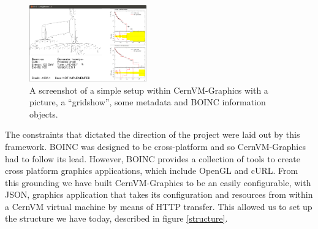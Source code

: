 \documentclass[twocolumn,aps]{revtex4}
\newcommand{\cernvm}{CernVM}
\newcommand{\cernvmgraphics}{\cernvm{}-Graphics}
\newcommand{\boinc}{BOINC}
\newcommand{\opengl}{OpenGL}
\newcommand{\curl}{cURL}
\newcommand{\json}{JSON}
\begin{document}
    \begin{figure}[hbt]
      \label{screenshot}
      \centering
        \includegraphics[width=0.45\textwidth]{graphics/screenshot.png}
      \caption
      {
        A screenshot of a simple setup within \cernvmgraphics{} with a
        picture, a ``gridshow'', some metadata and \boinc{} information 
        objects.
      }
    \end{figure}


    The constraints that dictated the direction of the project were laid out
    by this framework.  \boinc{} was designed to be cross-platform and so 
    \cernvmgraphics{} had to follow its lead. However, \boinc{} provides a 
    collection of tools to create cross platform graphics applications,
    which include \opengl{} and \curl{}. From this grounding we have built
    \cernvmgraphics{} to be an easily configurable, with \json{}, graphics 
    application that takes its configuration and resources from within a 
    \cernvm{} virtual machine by means of HTTP transfer. This allowed us to
    set up the structure we have today, described in figure \ref{structure}.
\end{document}
